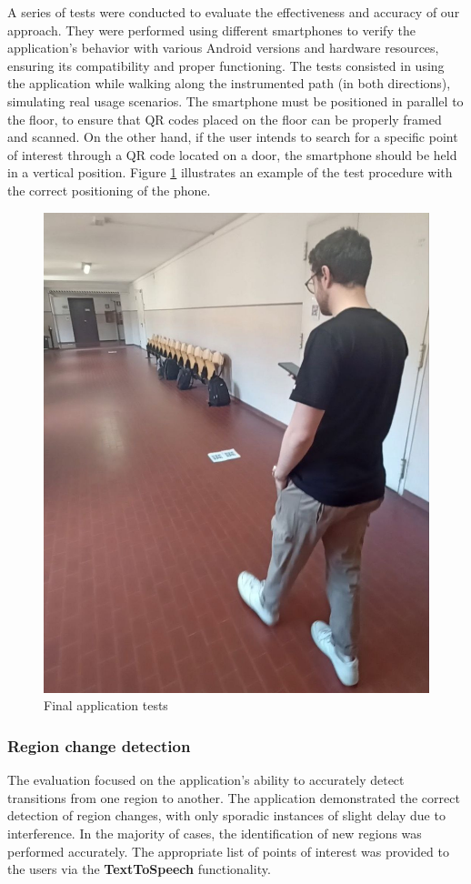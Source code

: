 A series of tests were conducted to evaluate the effectiveness and accuracy of our approach. They were performed using different smartphones to verify the application's behavior with various Android versions and hardware resources, ensuring its compatibility and proper functioning. The tests consisted in using the application while walking along the instrumented path (in both directions), simulating real usage scenarios. The smartphone must be positioned in parallel to the floor, to ensure that QR codes placed on the floor can be properly framed and scanned. On the other hand, if the user intends to search for a specific point of interest through a QR code located on a door, the smartphone should be held in a vertical position. Figure \ref{fig:application-test} illustrates an example of the test procedure with the correct positioning of the phone.

\begin{figure}[H]
    \centering
    \includegraphics[width=0.8\columnwidth]{chapters/experimental_results/images/application_test.jpg}
    \caption{Final application tests}
    \label{fig:application-test}
\end{figure}

\subsubsection{Region change detection}
The evaluation focused on the application's ability to accurately detect transitions from one region to another. The application demonstrated the correct detection of region changes, with only sporadic instances of slight delay due to interference. In the majority of cases, the identification of new regions was performed accurately. The appropriate list of points of interest was provided to the users via the \textbf{TextToSpeech} \cite{android:text-to-speech-ref} functionality.

